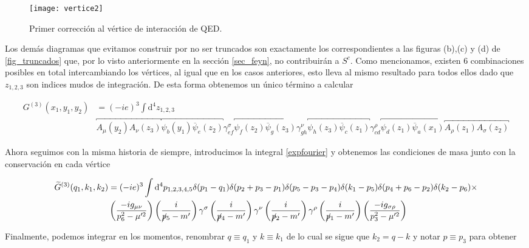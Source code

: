\documentclass[tickz]{article}
\numberwithin{equation}{section}
\begin{document}
\begin{figure}[h]
	\centering
	\texttt{[image: vertice2]}
	\caption{Primer corrección al vértice de interacción de QED.}
	\label{fig_vertex2}
\end{figure}

Los demás diagramas que evitamos construir por no ser truncados son exactamente los correspondientes a las figuras (b),(c) y (d) de \ref{fig_truncados} que, por lo visto anteriormente en la sección \ref{sec_feyn}, no contribuirán a $ S^c $.
Como mencionamos, existen 6 combinaciones posibles en total intercambiando los vértices, al igual que en los casos anteriores, esto lleva al mismo resultado para todos ellos dado que $ z_{1,2,3} $ son indices mudos de integración. De esta forma obtenemos un único término a calcular 

\begin{equation}\label{key}
\begin{aligned}
G^{(3)}(x_1,y_1,y_2)&=(-ie)^3\int \mathrm{d^4}z_{1,2,3}\\
& \overbracket{A_{\mu}(y_2)A_{\nu}(z_3)} \overbracket{\psi_b(y_1) \overline{\psi}_e(z_2)} \gamma^{\sigma}_{ef} \overbracket{\psi_f(z_2) \overline{\psi}_g(z_3)} \gamma^{\nu}_{gh} \overbracket{\psi_h(z_3) \overline{\psi}_c(z_1)} \gamma^{\rho}_{cd} \overbracket{\psi_d(z_1) \overline{\psi}_a(x_1)} \overbracket{ A_{\rho}(z_1)A_{\sigma}(z_2)}
\end{aligned}
\end{equation} 

Ahora seguimos con la misma historia de siempre, introducimos la integral \ref{expfourier} y obtenemos las condiciones de masa junto con la conservación en cada vértice

\begin{equation}\label{key}
\begin{aligned}
\widetilde{G}^{(3)}(q_1,k_1,k_2)&=(-ie)^3\int \mathrm{d^4}p_{1,2,3,4,5} \delta(p_1-q_1)\delta(p_2+p_3-p_1)\delta(p_5-p_3-p_4)\delta(k_1-p_5)\delta(p_4+p_6-p_2)\delta(k_2-p_6) \times\\
&\left(\frac{-ig_{\mu\nu}}{p_6^2-\mu'^2}\right)\left(\frac{i}{\cancel{p}_5-m'}\right)\gamma^{\sigma}\left(\frac{i}{\cancel{p}_4-m'}\right)\gamma^{\nu}\left(\frac{i}{\cancel{p}_2-m'}\right)\gamma^{\rho}\left(\frac{i}{\cancel{p}_1-m'}\right)\left(\frac{-ig_{\sigma\rho}}{p_3^2-\mu'^2}\right)
\end{aligned}
\end{equation}
 
Finalmente, podemos integrar en los momentos, renombrar $ q\equiv q_1 $ y $ k \equiv k_1 $ de lo cual se sigue que $ k_2 =q-k $
y notar $ p\equiv p_3 $ para obtener
\end{document}
